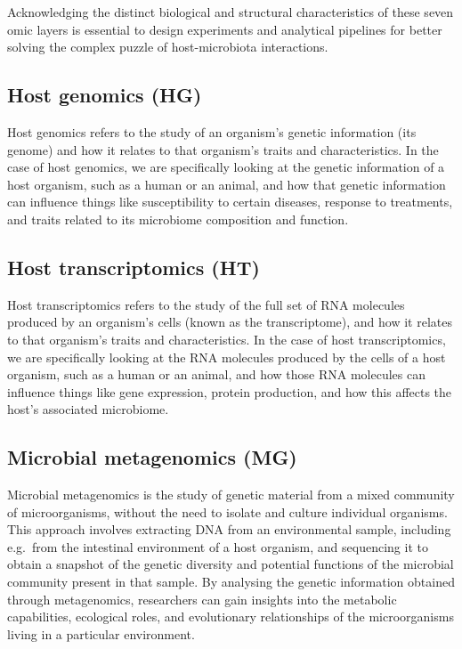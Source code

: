 \documentclass[
]{book}
\begin{document}
Acknowledging the distinct biological and structural characteristics of these seven omic layers is essential to design experiments and analytical pipelines for better solving the complex puzzle of host-microbiota interactions.

\hypertarget{host-genomics}{%
\subsection*{Host genomics (HG)}\label{host-genomics}}

Host genomics refers to the study of an organism's genetic information (its genome) and how it relates to that organism's traits and characteristics. In the case of host genomics, we are specifically looking at the genetic information of a host organism, such as a human or an animal, and how that genetic information can influence things like susceptibility to certain diseases, response to treatments, and traits related to its microbiome composition and function.

\hypertarget{host-transcriptomics}{%
\subsection*{Host transcriptomics (HT)}\label{host-transcriptomics}}

Host transcriptomics refers to the study of the full set of RNA molecules produced by an organism's cells (known as the transcriptome), and how it relates to that organism's traits and characteristics. In the case of host transcriptomics, we are specifically looking at the RNA molecules produced by the cells of a host organism, such as a human or an animal, and how those RNA molecules can influence things like gene expression, protein production, and how this affects the host's associated microbiome.

\hypertarget{microbial-metagenomics}{%
\subsection*{Microbial metagenomics (MG)}\label{microbial-metagenomics}}

Microbial metagenomics is the study of genetic material from a mixed community of microorganisms, without the need to isolate and culture individual organisms. This approach involves extracting DNA from an environmental sample, including e.g.~from the intestinal environment of a host organism, and sequencing it to obtain a snapshot of the genetic diversity and potential functions of the microbial community present in that sample. By analysing the genetic information obtained through metagenomics, researchers can gain insights into the metabolic capabilities, ecological roles, and evolutionary relationships of the microorganisms living in a particular environment.
\end{document}
